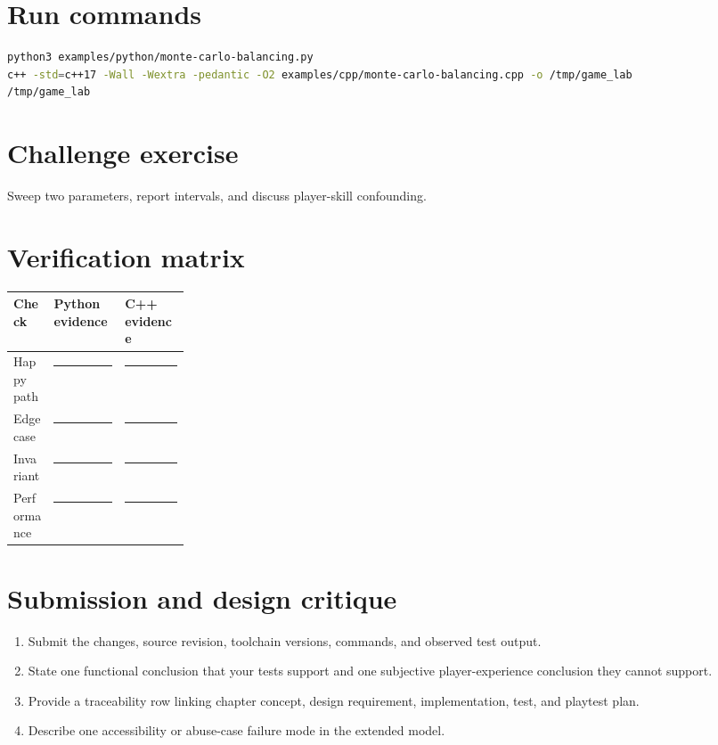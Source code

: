 \documentclass[11pt]{article}
\begin{document}
\section{Run commands}
\begin{lstlisting}[language=bash]
python3 examples/python/monte-carlo-balancing.py
c++ -std=c++17 -Wall -Wextra -pedantic -O2 examples/cpp/monte-carlo-balancing.cpp -o /tmp/game_lab
/tmp/game_lab
\end{lstlisting}

\section{Challenge exercise}
Sweep two parameters, report intervals, and discuss player-skill confounding.


\section{Verification matrix}
\begin{tabularx}{\linewidth}{@{}p{0.23\linewidth}X X@{}}\toprule Check & Python evidence & C++ evidence\\\midrule
Happy path & \rule{0.85\linewidth}{0.4pt} & \rule{0.85\linewidth}{0.4pt}\\[0.35cm]
Edge case & \rule{0.85\linewidth}{0.4pt} & \rule{0.85\linewidth}{0.4pt}\\[0.35cm]
Invariant & \rule{0.85\linewidth}{0.4pt} & \rule{0.85\linewidth}{0.4pt}\\[0.35cm]
Performance & \rule{0.85\linewidth}{0.4pt} & \rule{0.85\linewidth}{0.4pt}\\\bottomrule\end{tabularx}

\section{Submission and design critique}
\begin{enumerate}
\item Submit the changes, source revision, toolchain versions, commands, and observed test output.
\item State one functional conclusion that your tests support and one subjective player-experience conclusion they cannot support.
\item Provide a traceability row linking chapter concept, design requirement, implementation, test, and playtest plan.
\item Describe one accessibility or abuse-case failure mode in the extended model.
\end{enumerate}
\end{document}

